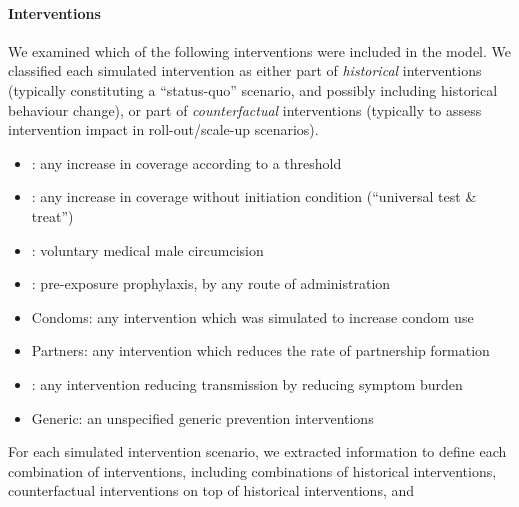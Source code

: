 \paragraph{Interventions}
We examined which of the following interventions were included in the model.
We classified each simulated intervention as either
part of \emph{historical} interventions
(typically constituting a ``status-quo'' scenario,
and possibly including historical behaviour change),  %
or part of \emph{counterfactual} interventions
(typically to assess intervention impact in roll-out/scale-up scenarios).
\begin{itemize}
  \item \art\cdf: any increase in \art coverage according to a \cdf threshold
  \item \art\utt: any increase in \art coverage without initiation condition
        (``universal test \& treat'')
  \item \vmmc: voluntary medical male circumcision
  \item \prep: pre-exposure prophylaxis, by any route of administration
  \item Condoms: any intervention which was simulated to increase condom use
  \item Partners: any intervention which reduces the rate of partnership formation
  \item \sti: any intervention reducing \hiv transmission by reducing \sti symptom burden
  \item Generic: an unspecified generic \hiv prevention interventions
\end{itemize}
For each simulated intervention scenario,
we extracted information to define each combination of interventions, including
combinations of historical interventions,
counterfactual interventions on top of historical interventions, and  %
